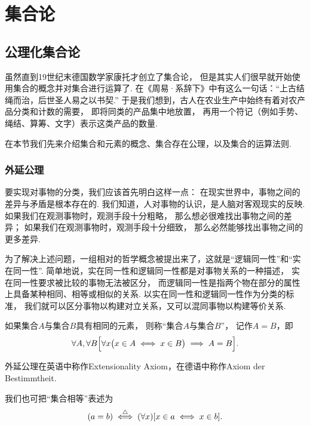 \chapter{集合论}

\section{公理化集合论}
虽然直到19世纪末德国数学家康托才创立了集合论，
但是其实人们很早就开始使用集合的概念并对集合进行运算了.
在《周易·系辞下》中有这么一句话：“上古结绳而治，后世圣人易之以书契.”
于是我们想到，古人在农业生产中始终有着对农产品分类和计数的需要，
即将同类的产品集中地放置，
再用一个符记（例如手势、绳结、算筹、文字）表示这类产品的数量.

在本节我们先来介绍集合和元素的概念、集合存在公理，以及集合的运算法则.

\subsection{外延公理}
要实现对事物的分类，我们应该首先明白这样一点：
在现实世界中，事物之间的差异与矛盾是根本存在的.
我们知道，人对事物的认识，是人脑对客观现实的反映.
如果我们在观测事物时，观测手段十分粗略，
那么想必很难找出事物之间的差异；
如果我们在观测事物时，观测手段十分细致，
那么必然能够找出事物之间的更多差异.

为了解决上述问题，一组相对的哲学概念被提出来了，这就是“逻辑同一性”和“实在同一性”.
简单地说，实在同一性和逻辑同一性都是对事物关系的一种描述，
实在同一性要求被比较的事物无法被区分，
而逻辑同一性是指两个物在部分的属性上具备某种相同、相等或相似的关系.
以实在同一性和逻辑同一性作为分类的标准，
我们就可以区分事物以构建对立关系，又可以混同事物以构建等价关系.


\begin{axiom}[外延公理I]
如果集合\(A\)与集合\(B\)具有相同的元素，
则称“集合\(A\)与集合\(B\)”，
记作\(A=B\)，即
\begin{equation}
	\forall A, \forall B \Bigl[
		\forall x \bigl( x \in A \iff x \in B \bigr)
		\implies
		A = B
	\Bigr].
\end{equation}
\end{axiom}
外延公理在英语中称作Extensionality Axiom，在德语中称作Axiom der Bestimmtheit.

我们也可把“集合相等”表述为
\begin{equation}
	(a=b)
	\overset{\triangle}{\iff}
	(\forall x)[x \in a \iff x \in b].
\end{equation}

